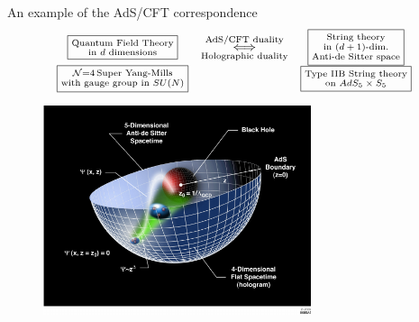 \documentclass{beamer}
\begin{document}
\begin{frame}{An example of the AdS/CFT correspondence}
\begin{equation*}
	\begin{array}{c c c}
		\fbox{$\substack{ \text{Quantum Field Theory} \\
			\text{in $d$ dimensions}}$}
		&  \underset{ \text{Holographic duality}}{ \overset{\text{AdS/CFT duality}}{\Longleftrightarrow} }
		& 
		\fbox{$\substack{ \text{String theory} \\
		\text{in $(d+1)$-dim.} \\
		\text{Anti-de Sitter space}}$}	
		\\
		\fbox{$\substack{ \mathcal{N} = 4 \, \text{Super Yang-Mills} \\
		\text{with gauge group in $SU(N)$}}$} 
	&
	&
	\fbox{$\substack{ \text{Type IIB String theory} \\
			\text{on $AdS_5 \times S_5$} }$}
	\\
	\end{array}
\end{equation*}

		\begin{figure}
	\includegraphics[width=0.7\textwidth]{images/Artists-conception-of-AdS-CFT-The-evolution-of-the-proton-at-different-length-scales-is.png}
\end{figure}

\end{frame}
\end{document}
